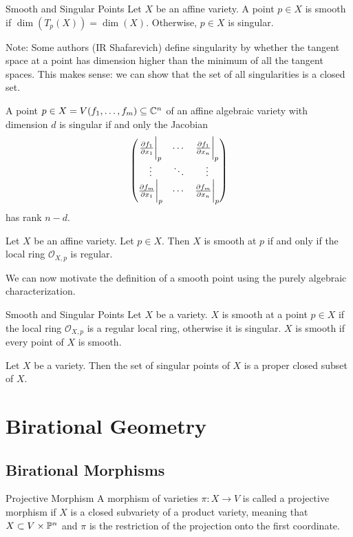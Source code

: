 \documentclass[a4paper]{article}
\begin{document}
\begin{defn}{Smooth and Singular Points}{} Let $X$ be an affine variety. A point $p\in X$ is smooth if $\dim(T_p(X))=\dim(X)$. Otherwise, $p\in X$ is singular. 
\end{defn}

Note: Some authors (IR Shafarevich) define singularity by whether the tangent space at a point has dimension higher than the minimum of all the tangent spaces. This makes sense: we can show that the set of all singularities is a closed set. 

\begin{prp}{}{} A point $p\in X=V(f_1,\dots,f_m)\subseteq\mathbb{C}^n$ of an affine algebraic variety with dimension $d$ is singular if and only the Jacobian $$\begin{pmatrix}
\frac{\partial f_1}{\partial x_1}\bigg{|}_p & \cdots & \frac{\partial f_1}{\partial x_n}\bigg{|}_p\\
\vdots & \ddots & \vdots\\
\frac{\partial f_m}{\partial x_1}\bigg{|}_p & \cdots & \frac{\partial f_m}{\partial x_n}\bigg{|}_p
\end{pmatrix}$$
has rank $n-d$. 
\end{prp}

\begin{prp}{}{} Let $X$ be an affine variety. Let $p\in X$. Then $X$ is smooth at $p$ if and only if the local ring $\mathcal{O}_{X,p}$ is regular. 
\end{prp}

We can now motivate the definition of a smooth point using the purely algebraic characterization. 

\begin{defn}{Smooth and Singular Points}{} Let $X$ be a variety. $X$ is smooth at a point $p\in X$ if the local ring $\mathcal{O}_{X,p}$ is a regular local ring, otherwise it is singular. $X$ is smooth if every point of $X$ is smooth. 
\end{defn}

\begin{thm}{}{} Let $X$ be a variety. Then the set of singular points of $X$ is a proper closed subset of $X$. 
\end{thm}

\pagebreak
\section{Birational Geometry}
\subsection{Birational Morphisms}
\begin{defn}{Projective Morphism}{} A morphism of varieties $\pi:X\to V$ is called a projective morphism if $X$ is a closed subvariety of a product variety, meaning that $X\subset V\times\mathbb{P}^n$ and $\pi$ is the restriction of the projection onto the first coordinate. 
\end{defn}
\end{document}
